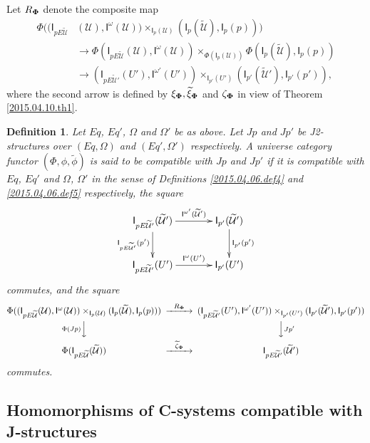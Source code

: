 \documentclass[12pt]{article}
\numberwithin{equation}{section}
\newtheorem{definition}[proposition]{Definition}
\newcommand{\sr}{\rightarrow}
\newcommand{\wt}{\widetilde}
\newcommand{\U}{\mathcal{U}}
\newcommand{\I}{\mathsf{I}}
\begin{document}
%
Let $R_{\bf\Phi}$ denote the composite map
%
\begin{align*}
  \Phi((\I_{pE\wt{\U}}&(\U), \I^{\omega}(\U))\times_{\I_p(\U)} (\I_p(\wt{\U}), \I_p(p))) \\
      & \sr \Phi(\I_{pE\wt{\U}}(\U), \I^{\omega}(\U))\times_{\Phi(\I_p(\U))}\Phi(\I_p(\wt{\U}), \I_p(p)) \\
      & \sr (\I_{pE\wt{\U}'}(U'),\I^{\omega'}(U'))\times_{\I_{p'}(U')}(\I_{p'}(\wt{\U}'),\I_{p'}(p')),
\end{align*}
%
where the second arrow is defined by $\xi_{\bf\Phi}, \wt{\xi}_{\bf\Phi}$ and
$\zeta_{\bf\Phi}$ in view of Theorem \ref{2015.04.10.th1}.
%
\begin{definition}
\label{2015.04.06.def6} Let $Eq$, $Eq'$, $\Omega$ and $\Omega'$ be as
above. Let $Jp$ and $Jp'$ be J2-structures over $(Eq,\Omega)$ and
$(Eq',\Omega')$ respectively.  A universe category functor
$(\Phi,\phi,\wt{\phi})$ is said to be compatible with $Jp$ and $Jp'$ if it is
compatible with $Eq$, $Eq'$ and $\Omega$, $\Omega'$ in the sense of Definitions
\ref{2015.04.06.def4} and \ref{2015.04.06.def5} respectively, the square
%
$$
\begin{xy}
          \xymatrix@C=3pc{ \I_{pE\wt{\U}'}(\wt{\U}')
            \ar[r]^-{\I^{\omega'}(\wt{\U}')} \ar[d]_-{\I_{pE\wt{\U}'}(p')} &
            \I_{p'}(\wt{\U}')\ar[d]^-{\I_{p'}(p')}\\ \I_{pE\wt{\U}'}(U')
            \ar[r]^-{\I^{\omega}(U')} & \I_{p'}(U') }
\end{xy}
$$
commutes, and the square
$$
\begin{CD}
\Phi((\I_{pE\wt{\U}}(\U), \I^{\omega}(\U))\times_{\I_p(\U)} (\I_p(\wt{\U}), \I_p(p)))
@>R_{\bf\Phi}>>
(\I_{pE\wt{\U}'}(U'),\I^{\omega'}(U'))\times_{\I_{p'}(U')}(\I_{p'}(\wt{\U}'),\I_{p'}(p'))\\ @V\Phi(Jp)
VV @VVJp' V\\ \Phi(\I_{pE\wt{\U}}(\wt{\U})) @>\wt{\zeta}_{\bf\Phi}>>
\I_{pE\wt{\U}'}(\wt{\U}')
\end{CD}
$$
%
commutes.
\end{definition}













\subsection{Homomorphisms of C-systems compatible with J-structures}
%
\end{document}
